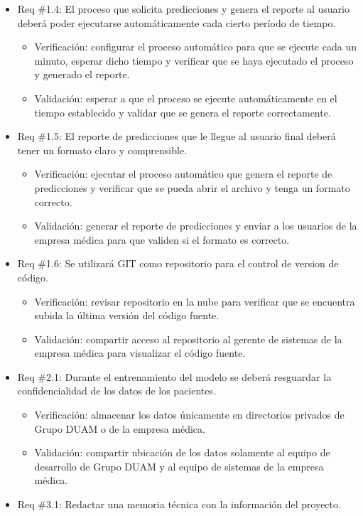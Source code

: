 \documentclass[
11pt, %
]{charter}
\begin{document}
\begin{itemize}
	\item Req \#1.4: El proceso que solicita predicciones y genera el reporte al usuario deberá poder ejecutarse automáticamente cada cierto período de tiempo.		
	\begin{itemize}
		\item Verificación: configurar el proceso automático para que se ejecute cada un minuto, esperar dicho tiempo y verificar que se haya ejecutado el proceso y generado el reporte.
		\item Validación: esperar a que el proceso se ejecute automáticamente en el tiempo establecido y validar que se genera el reporte correctamente.
	\end{itemize}
	\item Req \#1.5: El reporte de predicciones que le llegue al usuario final deberá tener un formato claro y comprensible.
	\begin{itemize}
		\item Verificación: ejecutar el proceso automático que genera el reporte de predicciones y verificar que se pueda abrir el archivo y tenga un formato correcto.
		\item Validación: generar el reporte de predicciones y enviar a los usuarios de la empresa médica para que validen si el formato es correcto.
	\end{itemize}
	\item Req \#1.6: Se utilizará GIT como repositorio para el control de version de código.
	\begin{itemize}
		\item Verificación: revisar repositorio en la nube para verificar que se encuentra subida la última versión del código fuente.
		\item Validación: compartir acceso al repositorio al gerente de sistemas de la empresa médica para visualizar el código fuente.
	\end{itemize}	
	\item Req \#2.1: Durante el entrenamiento del modelo se deberá resguardar la confidencialidad de los datos de los pacientes.	
	\begin{itemize}
		\item Verificación: almacenar los datos únicamente en directorios privados de Grupo DUAM o de la empresa médica.
		\item Validación: compartir ubicación de los datos solamente al equipo de desarrollo de Grupo DUAM y al equipo de sistemas de la empresa médica.
	\end{itemize}
	\item Req \#3.1: Redactar una memoria técnica con la información del proyecto.

\end{itemize}
\end{document}
